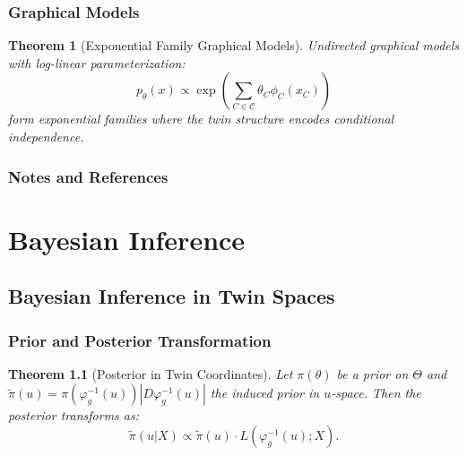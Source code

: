 \documentclass[11pt,twoside]{book}
\theoremstyle{plain}
\newtheorem{theorem}{Theorem}[chapter]
\theoremstyle{definition}
\theoremstyle{remark}
\begin{document}
\section{Graphical Models}
\label{sec:graphical}

\begin{theorem}[Exponential Family Graphical Models]
    Undirected graphical models with log-linear parameterization:
    \[
    p_\theta(x) \propto \exp\left(\sum_{C \in \mathcal{C}} \theta_C \phi_C(x_C)\right)
    \]
    form exponential families where the twin structure encodes conditional independence.
\end{theorem}

\section{Notes and References}
\label{sec:ch7_notes}


\part{Bayesian Inference}
\label{part:bayesian}


\chapter{Bayesian Inference in Twin Spaces}
\label{ch:bayesian}

\section{Prior and Posterior Transformation}
\label{sec:prior_posterior}

\begin{theorem}[Posterior in Twin Coordinates]
    Let $\pi(\theta)$ be a prior on $\Theta$ and $\tilde{\pi}(u) = \pi(\varphi_g^{-1}(u)) |D\varphi_g^{-1}(u)|$ the induced prior in $u$-space. Then the posterior transforms as:
    \[
    \tilde{\pi}(u | X) \propto \tilde{\pi}(u) \cdot L(\varphi_g^{-1}(u); X).
    \]
\end{theorem}
\end{document}
